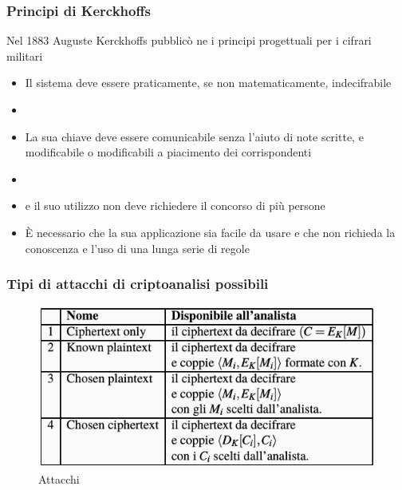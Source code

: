 		{\fontsize{10}{0}
		\begin{frame}
			\frametitle{Principi di Kerckhoffs}	
			Nel 1883 Auguste Kerckhoffs pubblicò ne  i principi progettuali per i cifrari militari	
			\begin{itemize}
				\item Il sistema deve essere praticamente, se non matematicamente, indecifrabile
				\item {}
				\item La sua chiave deve essere comunicabile senza l'aiuto di note scritte, e modificabile o modificabili a piacimento dei corrispondenti
				\item {}
				\item {} e il suo utilizzo non deve richiedere il concorso di più persone
				\item È necessario che la sua applicazione sia facile da usare e che non richieda la conoscenza e l'uso di una lunga serie di regole	
			\end{itemize}
		\end{frame}}
		
		\begin{frame}
			\frametitle{Tipi di attacchi di criptoanalisi possibili}		
			\begin{figure}
				\begin{center}
						\includegraphics[scale = 0.45]{img/attacchi}
						\caption{Attacchi}
				\end{center}
			\end{figure}
		\end{frame}

